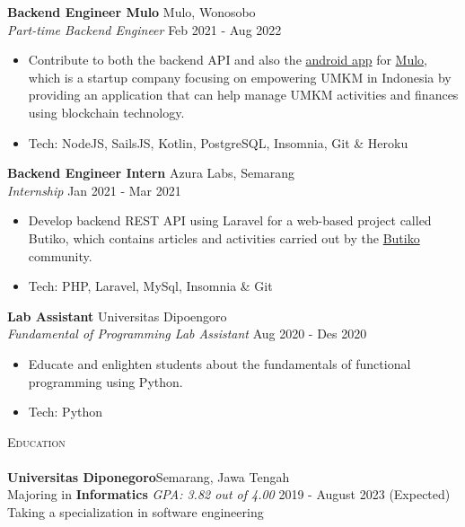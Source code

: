 \documentclass[a4paper]{article}
\newcommand{\lineunder} {
    \vspace*{-8pt} \\
    \hspace*{-18pt} \hrulefill \\
}
\newcommand{\header} [1] {
    {\hspace*{-18pt}\vspace*{6pt} \textsc{#1}}
    \vspace*{-6pt} \lineunder
}
\begin{document}
\textbf{Backend Engineer Mulo} \hfill Mulo, Wonosobo\\
\textit{Part-time Backend Engineer} \hfill Feb 2021 - Aug 2022\\
\vspace{-1mm}
\begin{itemize} \itemsep 1pt
	\item Contribute to both the backend API and also the \href{https://play.google.com/store/apps/details?id=app.mulo}{android app} for \href{https://muloapp.id/}{Mulo}, which is a startup company focusing on empowering UMKM in Indonesia by providing an application that can help manage UMKM activities and finances using blockchain technology.
	\item Tech: NodeJS, SailsJS, Kotlin, PostgreSQL, Insomnia, Git \& Heroku
\end{itemize}

\textbf{Backend Engineer Intern} \hfill Azura Labs, Semarang\\
\textit{Internship} \hfill Jan 2021 - Mar 2021\\
\vspace{-1mm}
\begin{itemize} \itemsep 1pt
	\item Develop backend REST API using Laravel for a web-based project called \textquotesingle{}Butiko\textquotesingle{}, which contains articles and activities carried out by the \textquotesingle{}\href{https://butiko.id/}{Butiko}\textquotesingle{} community.
	\item Tech: PHP, Laravel, MySql, Insomnia \& Git
\end{itemize}

\textbf{Lab Assistant} \hfill Universitas Dipoengoro\\
\textit{Fundamental of Programming Lab Assistant} \hfill Aug 2020 - Des 2020\\
\vspace{-1mm}
\begin{itemize} \itemsep 1pt
	\item Educate and enlighten students about the fundamentals of functional programming using Python.
	\item Tech: Python
\end{itemize}

\header{Education}
\textbf{Universitas Diponegoro}\hfill Semarang, Jawa Tengah\\
Majoring in \textbf{Informatics} \textit{GPA: 3.82 out of 4.00} \hfill 2019 - August 2023 (Expected)\\
Taking a specialization in software engineering
\vspace{2mm}
\end{document}
